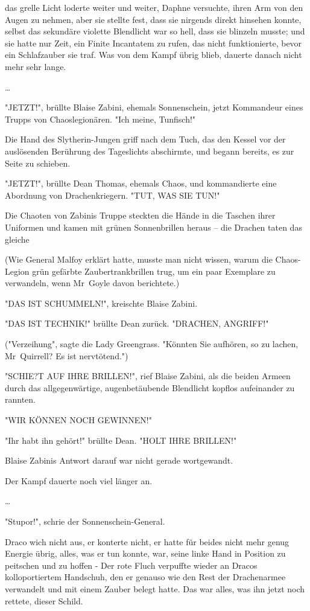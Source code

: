 {das grelle Licht loderte weiter und weiter, Daphne versuchte, ihren Arm von den Augen zu nehmen, aber sie stellte fest, dass sie nirgends direkt hinsehen konnte, selbst das sekundäre violette Blendlicht war so hell, dass sie blinzeln musste; und sie hatte nur Zeit, ein Finite Incantatem zu rufen, das nicht funktionierte, bevor ein Schlafzauber sie traf. Was von dem Kampf übrig blieb, dauerte danach nicht mehr sehr lange.

…

"JETZT!", brüllte Blaise Zabini, ehemals Sonnenschein, jetzt Kommandeur eines Trupps von Chaoslegionären. "Ich meine, Tunfisch!"

Die Hand des Slytherin-Jungen griff nach dem Tuch, das den Kessel vor der auslösenden Berührung des Tageslichts abschirmte, und begann bereits, es zur Seite zu schieben.

"JETZT!", brüllte Dean Thomas, ehemals Chaos, und kommandierte eine Abordnung von Drachenkriegern. "TUT, WAS SIE TUN!"

Die Chaoten von Zabinis Truppe steckten die Hände in die Taschen ihrer Uniformen und kamen mit grünen Sonnenbrillen heraus -- die Drachen taten das gleiche

(Wie General Malfoy erklärt hatte, musste man nicht wissen, warum die Chaos-Legion grün gefärbte Zaubertrankbrillen trug, um ein paar Exemplare zu verwandeln, wenn Mr~Goyle davon berichtete.)

"DAS IST SCHUMMELN!", kreischte Blaise Zabini.

"DAS IST TECHNIK!" brüllte Dean zurück. "DRACHEN, ANGRIFF!"

("Verzeihung", sagte die Lady Greengrass. "Könnten Sie aufhören, so zu lachen, Mr~Quirrell? Es ist nervtötend.")

"SCHIE?T AUF IHRE BRILLEN!", rief Blaise Zabini, als die beiden Armeen durch das allgegenwärtige, augenbetäubende Blendlicht kopflos aufeinander zu rannten.

"WIR KÖNNEN NOCH GEWINNEN!"

"Ihr habt ihn gehört!" brüllte Dean. "HOLT IHRE BRILLEN!"

Blaise Zabinis Antwort darauf war nicht gerade wortgewandt.

Der Kampf dauerte noch viel länger an.

…

"Stupor!", schrie der Sonnenschein-General.

Draco wich nicht aus, er konterte nicht, er hatte für beides nicht mehr genug Energie übrig, alles, was er tun konnte, war, seine linke Hand in Position zu peitschen und zu hoffen - Der rote Fluch verpuffte wieder an Dracos kolloportiertem Handschuh, den er genauso wie den Rest der Drachenarmee verwandelt und mit einem Zauber belegt hatte. Das war alles, was ihn jetzt noch rettete, dieser Schild.

}
